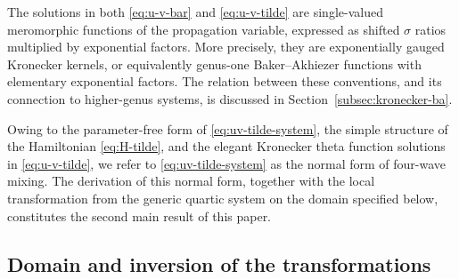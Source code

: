\documentclass[11pt,a4paper]{article}
\numberwithin{equation}{section}
\begin{document}
The solutions in both \eqref{eq:u-v-bar} and \eqref{eq:u-v-tilde} are single-valued meromorphic functions of the propagation variable, expressed as shifted $\sigma$ ratios multiplied by exponential factors.
More precisely, they are exponentially gauged Kronecker kernels, or equivalently genus-one Baker--Akhiezer functions with elementary exponential factors.
The relation between these conventions, and its connection to higher-genus systems, is discussed in Section~\ref{subsec:kronecker-ba}.

Owing to the parameter-free form of \eqref{eq:uv-tilde-system}, the simple structure of the Hamiltonian \eqref{eq:H-tilde}, and the elegant Kronecker theta function solutions in \eqref{eq:u-v-tilde}, we refer to \eqref{eq:uv-tilde-system} as the normal form of four-wave mixing.
The derivation of this normal form, together with the local transformation from the generic quartic system on the domain specified below, constitutes the second main result of this paper.



\subsection{Domain and inversion of the transformations}
\label{subsec:transform-domain}
\end{document}

